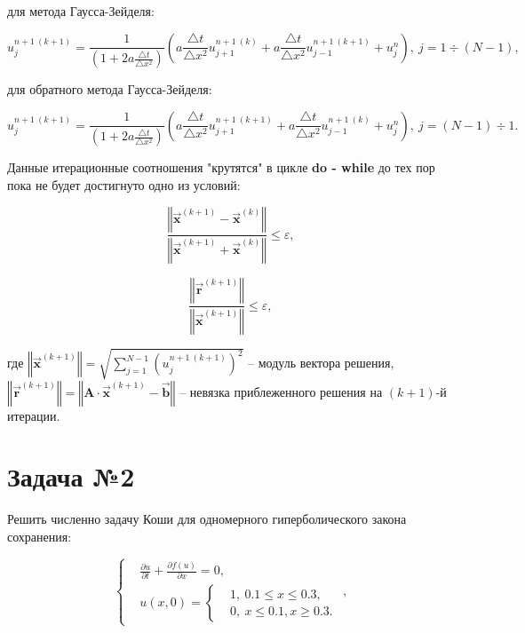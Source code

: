 \documentclass[12pt,a4paper]{article}
\begin{document}
		для метода Гаусса-Зейделя:

		\begin{equation}
			u^{n+1 \: (k+1)}_{j} = \frac{1}{\left( 1 + 2 a \frac{\triangle t}{\triangle x^{2}} \right)} \left( a \frac{\triangle t}{\triangle x^{2}} u^{n+1 \: (k)}_{j+1} + a \frac{\triangle t}{\triangle x^{2}} u^{n+1 \: (k+1)}_{j-1} + u^{n}_{j} \right), \: j = 1 \div (N - 1),
		\end{equation}

		для обратного метода Гаусса-Зейделя:

		\begin{equation}
			u^{n+1 \: (k+1)}_{j} = \frac{1}{\left( 1 + 2 a \frac{\triangle t}{\triangle x^{2}} \right)} \left( a \frac{\triangle t}{\triangle x^{2}} u^{n+1 \: (k+1)}_{j+1} + a \frac{\triangle t}{\triangle x^{2}} u^{n+1 \: (k)}_{j-1} + u^{n}_{j} \right), \: j = (N - 1) \div 1.
		\end{equation}

		Данные итерационные соотношения "крутятся" в цикле \textbf{do - while} до тех пор пока не будет достигнуто одно из условий:
	
		\begin{equation}
			\frac{\left\Vert \vec{\mathbf{x}}^{(k + 1)} - \vec{\mathbf{x}}^{(k)} \right\Vert}{\left\Vert \vec{\mathbf{x}}^{(k + 1)} + \vec{\mathbf{x}}^{(k)} \right\Vert} \leqslant \varepsilon,
		\end{equation}

		\begin{equation}
			\frac{\left\Vert \vec{\mathbf{r}}^{(k + 1)} \right\Vert}{\left\Vert \vec{\mathbf{x}}^{(k + 1)} \right\Vert} \leqslant \varepsilon,
		\end{equation}

		где $\left\Vert \vec{\mathbf{x}}^{(k + 1)} \right\Vert = \sqrt{\sum^{N-1}_{j=1} \left( u^{n+1 \: (k+1)}_{j} \right)^{2}}$ -- модуль вектора решения, $\left\Vert \vec{\mathbf{r}}^{(k + 1)} \right\Vert = \left\Vert \mathbf{A} \cdot \vec{\mathbf{x}}^{(k+1)} - \vec{\mathbf{b}}\right\Vert$ -- невязка приблеженного решения на $(k+1)$-й итерации.

		\newpage

	\section*{Задача №2}

		Решить численно задачу Коши для одномерного гиперболического закона сохранения:

		\begin{equation}
			\begin{cases}
				& \frac{\partial u}{\partial t} + \frac{\partial f \left( u \right)}{\partial x} = 0, \\
				& u \left( x, 0 \right) =
					\begin{cases}
						& 1, \: 0.1 \leqslant x \leqslant 0.3, \\
						& 0, \: x \leqslant 0.1, x \geqslant 0.3.
					\end{cases}
			\end{cases},
		\end{equation}
\end{document}
